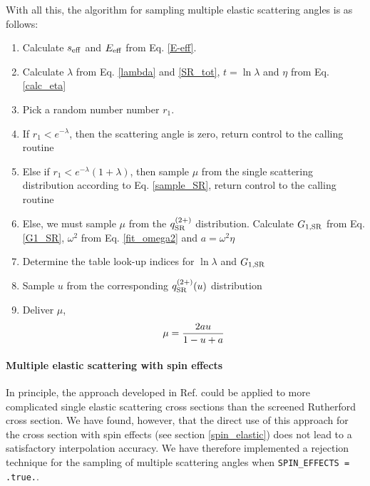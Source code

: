 With all this, the algorithm for sampling multiple elastic scattering 
angles is as follows:
\begin{enumerate}
\item
Calculate $s_{\rm eff}$ and $E_{\rm eff}$ from Eq. \eqref{E-eff}.
\item
Calculate $\lambda$ from Eq. \eqref{lambda} and \eqref{SR_tot}, 
$t = \ln \lambda$  and $\eta$ from Eq. \eqref{calc_eta}
\item
Pick a random number number $r_1$. 
\item
If $r_1 < e^{-\lambda}$, then the scattering angle is zero, return 
control to the calling routine
\item
Else if $r_1 < e^{-\lambda}(1 + \lambda)$, then sample $\mu$ from 
the single scattering distribution according to Eq. \eqref{sample_SR}, 
return
control to the calling routine
\item
Else, we must sample $\mu$ from the $q^{(2+)}_{\rm SR}$ distribution. 
Calculate $G_{1,{\rm SR}}$ from Eq. \eqref{G1_SR}, 
$\omega^2$ from Eq. \eqref{fit_omega2} and 
$a = \omega^2 \eta$
\item
Determine the table look-up indices for $\ln \lambda$ and $G_{1,{\rm SR}}$
\item
Sample $u$ from the corresponding $q^{(2+)}_{\rm SR}(u)$ distribution
\item
Deliver $\mu$,
\begin{equation}
\mu = {2 a u \over 1 - u + a}
\end{equation}
\end{enumerate}


\paragraph{Multiple elastic scattering with spin effects} \hfill

In principle, the approach developed in Ref. \cite{KB97} could 
be applied to more complicated single elastic scattering cross 
sections than the screened Rutherford cross section. 
We have found, however, that the direct use of this approach for 
the cross section with spin effects (see section \ref{spin_elastic})
does not lead to a satisfactory interpolation accuracy. We have 
therefore implemented a rejection technique for the sampling 
of multiple scattering angles when {\tt SPIN\_EFFECTS = .true.}. 

